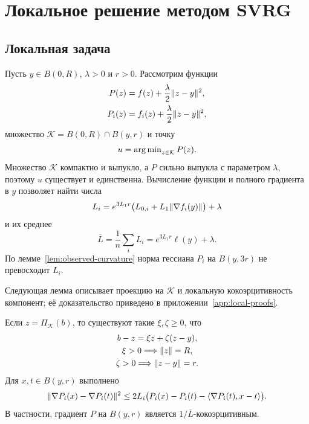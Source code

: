 \section{Локальное решение методом SVRG}\label{app:solver-implementation}
\subsection{Локальная задача}
Пусть $y\in B(0,R)$, $\lambda>0$ и $r>0$. Рассмотрим функции
\begin{equation}\label{eq:local-problem}
 \begin{aligned}
 P(z)&=f(z)+\frac\lambda2\lVert z-y\rVert^2,\\
 P_i(z)&=f_i(z)+\frac\lambda2\lVert z-y\rVert^2,
 \end{aligned}
\end{equation}
множество $\mathcal K=B(0,R)\cap B(y,r)$ и точку
\[
 u=\operatorname{arg\,min}_{z\in\mathcal K}P(z).
\]
Множество $\mathcal K$ компактно и выпукло, а $P$ сильно выпукла с параметром
$\lambda$, поэтому $u$ существует и единственна. Вычисление функции и полного градиента в $y$
позволяет найти числа
\begin{equation}\label{eq:local-smoothness}
 L_i=e^{3L_1r}\bigl(L_{0,i}+L_1\lVert\nabla f_i(y)\rVert\bigr)+\lambda
\end{equation}
и их среднее
\[
 \overline L=\frac1n\sum_iL_i=e^{3L_1r}\ell(y)+\lambda.
\]
По лемме~\ref{lem:observed-curvature} норма гессиана $P_i$ на $B(y,3r)$
не превосходит $L_i$.

Следующая лемма описывает проекцию на $\mathcal K$ и локальную
кокоэрцитивность компонент; её доказательство приведено
в приложении~\ref{app:local-proofs}.

\begin{lemma}\label{lem:local-projection}
Если $z=\Pi_{\mathcal K}(b)$, то существуют такие $\xi,\zeta\ge0$, что
\begin{equation}\label{eq:two-ball-normal}
 \begin{gathered}
 b-z=\xi z+\zeta(z-y),\\
 \xi>0\Longrightarrow\lVert z\rVert=R,\\
 \zeta>0\Longrightarrow\lVert z-y\rVert=r.
 \end{gathered}
\end{equation}
Для $x,t\in B(y,r)$ выполнено
\begin{equation}\label{eq:local-bregman}
 \lVert\nabla P_i(x)-\nabla P_i(t)\rVert^2
 \le2L_i\bigl(P_i(x)-P_i(t)-\langle \nabla P_i(t),x-t\rangle\bigr).
\end{equation}
В частности, градиент $P$ на $B(y,r)$ является $1/\overline L$-кокоэрцитивным.
\end{lemma}

